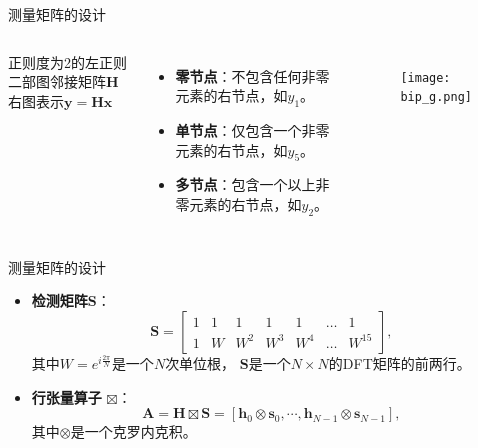 \documentclass{ldr-simple-gray}
\begin{document}
\begin{frame}{测量矩阵的设计}
    
    \begin{columns}
        正则度为2的左正则二部图邻接矩阵$\mathbf{H}$\\
        右图表示$\mathbf{y} = \mathbf{Hx}$
        \begin{itemize}
            \item \textbf{零节点}：不包含任何非零元素的右节点，如$y_1$。
            \item \textbf{单节点}：仅包含一个非零元素的右节点，如$y_5$。
            \item \textbf{多节点}：包含一个以上非零元素的右节点，如$y_2$。
        \end{itemize}
        \begin{figure}
            \centering
            \texttt{[image: bip\_g.png]}
        \end{figure}
        
    \end{columns}

\end{frame}

\begin{frame}{测量矩阵的设计}
    \begin{itemize}
        \item \textbf{检测矩阵}$\mathbf{S}$：
        \begin{equation*}
            \mathbf{S}=
            \left[
                \begin{array}{ccccccc}
                    1 & 1 & 1  & 1 & 1 & \dots & 1 \\
                    1 & W & W^2 & W^3 & W^4 & \dots & W^{15}
                \end{array}
                \right],
            \label{S}
        \end{equation*}
        其中$W = e^{i \frac{2\pi}{N}}$是一个$N$次单位根，
        $\mathbf{S}$是一个$N \times N$的DFT矩阵的前两行。
        \item \textbf{行张量算子} $\boxtimes$：
        \begin{equation*}
            \mathbf{A} = \mathbf{H} \boxtimes \mathbf{S} = \left[\mathbf{h}_0 \otimes \mathbf{s}_0 , \cdots , \mathbf{h}_{N-1} \otimes \mathbf{s}_{N-1} \right],
        \end{equation*}
        其中$\otimes$是一个克罗内克积。
    \end{itemize}
\end{frame}
\end{document}
